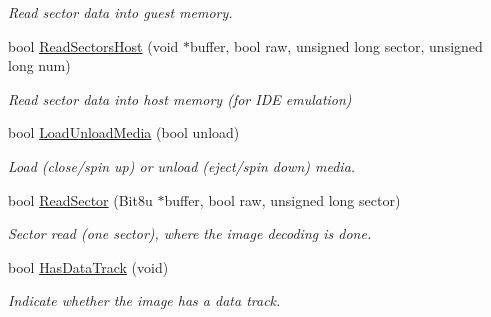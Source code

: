 \begin{DoxyCompactItemize}
\begin{DoxyCompactList}\small\item\em Read sector data into guest memory. \end{DoxyCompactList}\item 
\hypertarget{classCDROM__Interface__Image_ae686caa17e265089d6cd1a69ecc5b332}{bool \hyperlink{classCDROM__Interface__Image_ae686caa17e265089d6cd1a69ecc5b332}{Read\-Sectors\-Host} (void $\ast$buffer, bool raw, unsigned long sector, unsigned long num)}\label{classCDROM__Interface__Image_ae686caa17e265089d6cd1a69ecc5b332}

\begin{DoxyCompactList}\small\item\em Read sector data into host memory (for I\-D\-E emulation) \end{DoxyCompactList}\item 
\hypertarget{classCDROM__Interface__Image_af5aa7f94de1d7c77ff6b484b380c5351}{bool \hyperlink{classCDROM__Interface__Image_af5aa7f94de1d7c77ff6b484b380c5351}{Load\-Unload\-Media} (bool unload)}\label{classCDROM__Interface__Image_af5aa7f94de1d7c77ff6b484b380c5351}

\begin{DoxyCompactList}\small\item\em Load (close/spin up) or unload (eject/spin down) media. \end{DoxyCompactList}\item 
\hypertarget{classCDROM__Interface__Image_acbed60c6b06009b2a027d605190ee842}{bool \hyperlink{classCDROM__Interface__Image_acbed60c6b06009b2a027d605190ee842}{Read\-Sector} (Bit8u $\ast$buffer, bool raw, unsigned long sector)}\label{classCDROM__Interface__Image_acbed60c6b06009b2a027d605190ee842}

\begin{DoxyCompactList}\small\item\em Sector read (one sector), where the image decoding is done. \end{DoxyCompactList}\item 
\hypertarget{classCDROM__Interface__Image_a7348536d197510d1442419f2aa172ccc}{bool \hyperlink{classCDROM__Interface__Image_a7348536d197510d1442419f2aa172ccc}{Has\-Data\-Track} (void)}\label{classCDROM__Interface__Image_a7348536d197510d1442419f2aa172ccc}

\begin{DoxyCompactList}\small\item\em Indicate whether the image has a data track. \end{DoxyCompactList}\end{DoxyCompactItemize}
